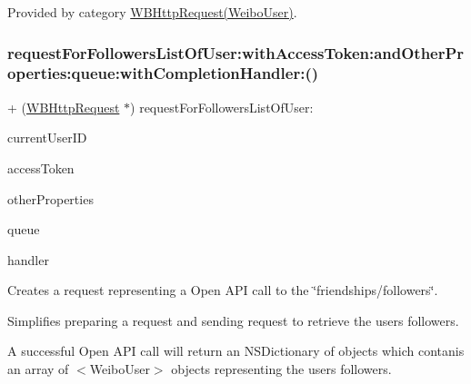 Provided by category \mbox{\hyperlink{category_w_b_http_request_07_weibo_user_08_a0437dae63fa8fe40c7c5b323b45e0094}{W\+B\+Http\+Request(\+Weibo\+User)}}.

\mbox{\label{interface_w_b_http_request_a0437dae63fa8fe40c7c5b323b45e0094}} 
\subsubsection{\texorpdfstring{request\+For\+Followers\+List\+Of\+User\+:with\+Access\+Token\+:and\+Other\+Properties\+:queue\+:with\+Completion\+Handler\+:()}{requestForFollowersListOfUser:withAccessToken:andOtherProperties:queue:withCompletionHandler:()}\hspace{0.1cm}{\footnotesize\ttfamily [2/3]}}
{\footnotesize\ttfamily + (\mbox{\hyperlink{interface_w_b_http_request}{W\+B\+Http\+Request}} $\ast$) request\+For\+Followers\+List\+Of\+User\+: \begin{DoxyParamCaption}\item[{(N\+S\+String $\ast$)}]{current\+User\+ID }\item[{withAccessToken:(N\+S\+String $\ast$)}]{access\+Token }\item[{andOtherProperties:(N\+S\+Dictionary $\ast$)}]{other\+Properties }\item[{queue:(N\+S\+Operation\+Queue $\ast$)}]{queue }\item[{withCompletionHandler:(W\+B\+Request\+Handler)}]{handler }\end{DoxyParamCaption}}

Creates a request representing a Open A\+PI call to the \char`\"{}friendships/followers\char`\"{}.

Simplifies preparing a request and sending request to retrieve the user\textquotesingle{}s followers.

A successful Open A\+PI call will return an N\+S\+Dictionary of objects which contanis an array of $<$\+Weibo\+User$>$ objects representing the user\textquotesingle{}s followers.

